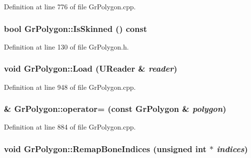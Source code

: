 \begin{CompactItemize}
Definition at line 776 of file GrPolygon.cpp.\hypertarget{class_gr_polygon_16dcd5af11fdb2e6278011e06c42e2e8}{
\subsubsection[{IsSkinned}]{\setlength{\rightskip}{0pt plus 5cm}bool GrPolygon::IsSkinned () const}}
\label{class_gr_polygon_16dcd5af11fdb2e6278011e06c42e2e8}




Definition at line 130 of file GrPolygon.h.\hypertarget{class_gr_polygon_c9a85b2f9ebbdc644bf51e738edde549}{
\subsubsection[{Load}]{\setlength{\rightskip}{0pt plus 5cm}void GrPolygon::Load ({\bf UReader} \& {\em reader})}}
\label{class_gr_polygon_c9a85b2f9ebbdc644bf51e738edde549}




Definition at line 948 of file GrPolygon.cpp.\hypertarget{class_gr_polygon_eb49875dbda2f349029f033612a987be}{
\subsubsection[{operator=}]{ \& GrPolygon::operator= (const {\bf GrPolygon} \& {\em polygon})}}
\label{class_gr_polygon_eb49875dbda2f349029f033612a987be}




Definition at line 884 of file GrPolygon.cpp.\hypertarget{class_gr_polygon_e51b46ace5d4dfc73396033fd4858c51}{
\subsubsection[{RemapBoneIndices}]{\setlength{\rightskip}{0pt plus 5cm}void GrPolygon::RemapBoneIndices (unsigned int $\ast$ {\em indices})}}
\label{class_gr_polygon_e51b46ace5d4dfc73396033fd4858c51}





\end{CompactItemize}
